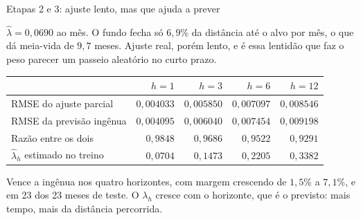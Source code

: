 \documentclass[aspectratio=169,11pt]{beamer}
\begin{document}
\begin{frame}{Etapas 2 e 3: ajuste lento, mas que ajuda a prever}

$\widehat\lambda = 0{,}0690$ ao mês. O fundo fecha só $6{,}9\%$ da distância até o alvo por
mês, o que dá meia-vida de $9{,}7$ meses. Ajuste real, porém lento, e é essa lentidão que faz
o peso parecer um passeio aleatório no curto prazo.

\vspace{0.9em}
\centering
\small
\begin{tabular}{@{}lrrrr@{}}
\toprule
& $h=1$ & $h=3$ & $h=6$ & $h=12$ \\
\midrule
RMSE do ajuste parcial & $0{,}004033$ & $0{,}005850$ & $0{,}007097$ & $0{,}008546$ \\
RMSE da previsão ingênua & $0{,}004095$ & $0{,}006040$ & $0{,}007454$ & $0{,}009198$ \\
Razão entre os dois & $0{,}9848$ & $0{,}9686$ & $0{,}9522$ & $0{,}9291$ \\
$\widehat\lambda_h$ estimado no treino & $0{,}0704$ & $0{,}1473$ & $0{,}2205$ & $0{,}3382$ \\
\bottomrule
\end{tabular}

\vspace{0.9em}
\raggedright
\normalsize
Vence a ingênua nos quatro horizontes, com margem crescendo de $1{,}5\%$ a $7{,}1\%$, e em
23 dos 23 meses de teste. O $\lambda_h$ cresce com o horizonte, que é o previsto: mais tempo,
mais da distância percorrida.

\end{frame}
\end{document}
